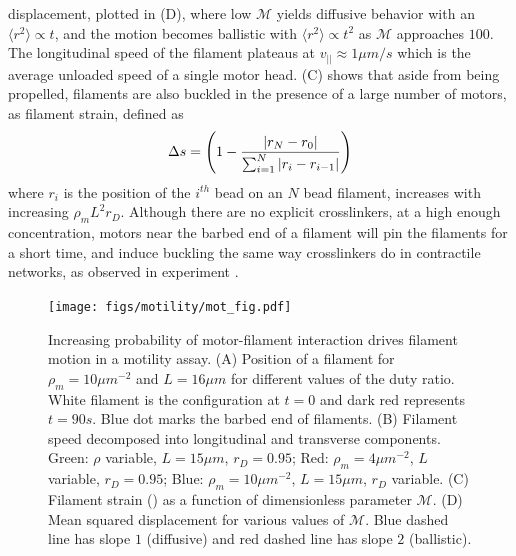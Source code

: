 \documentclass[12pt]{article}
\begin{document}
displacement, plotted in (D), where low $\mathcal{M}$ 
yields diffusive behavior with an $\langle r^2 \rangle \propto t$, and the
motion becomes ballistic with $\langle r^2\rangle\propto t^2$ as $\mathcal{M}$ 
approaches $100$. The longitudinal speed of the filament plateaus at
$v_{||}\approx 1\mu m/s$ which is the average unloaded speed of a single motor 
head\cite{kron1986}. (C) shows that aside from being
propelled, filaments are also buckled in the presence of a large number of
motors, as filament strain, defined as
\begin{equation} 
  \Delta s = \left(1 - {|r_N-r_0|\over\sum_{i=1}^N{|r_i-r_{i-1}|}}\right) 
  \label{eqn:fil_strain}
\end{equation} 
where $r_i$ is the position of the $i^{th}$ bead on an $N$ bead filament, increases with 
increasing $\rho_m L^2 r_D$.
Although there are no explicit crosslinkers, at a high enough concentration, 
motors near the barbed end of a filament will pin the filaments for a short 
time, and induce buckling the same way crosslinkers do in contractile networks, 
as observed in experiment \cite{schaller2010}.
\begin{figure}[H] 
    \centering
    \texttt{[image: figs/motility/mot\_fig.pdf]}
  \caption{%
  \label{fig:motility}%
  Increasing probability of motor-filament interaction drives filament motion in a motility assay. 
  (A) Position of a filament for $\rho_m = 10\mu m^{-2}$ and $L = 16\mu m$ for
  different values of the duty ratio. White filament is the configuration at
  $t=0$ and dark red represents $t=90s$. Blue dot marks the barbed end of
  filaments.  
  (B) Filament speed decomposed into longitudinal and transverse components. 
  Green: $\rho$ variable, $L=15\mu m$, $r_D=0.95$; Red:
  $\rho_m=4\mu m^{-2}$, $L$ variable, $r_D=0.95$; Blue: $\rho_m = 10\mu m^{-2}$,
  $L=15\mu m$, $r_D$ variable.  
  (C) Filament strain () as a function of
  dimensionless parameter $\mathcal{M}$.
  (D) Mean squared displacement for various values of $\mathcal{M}$. Blue dashed 
  line has slope $1$ (diffusive) and red dashed line has slope $2$ (ballistic).
 }
\end{figure}
\end{document}

